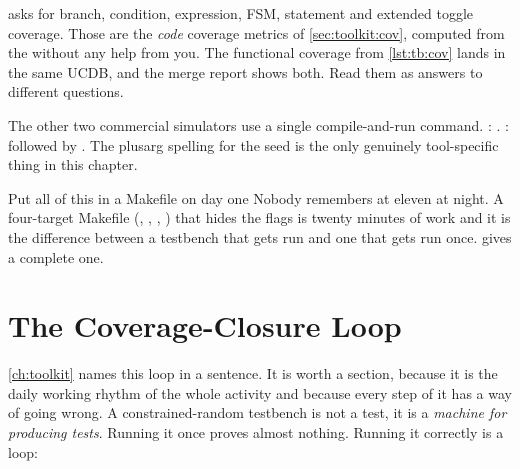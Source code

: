  asks for branch, condition, expression, FSM, statement and
extended toggle coverage. Those are the \emph{code} coverage metrics of
\cref{sec:toolkit:cov}, computed from the \RTL{} without any help from you. The
functional coverage from \cref{lst:tb:cov} lands in the same UCDB, and the
merge report shows both. Read them as answers to different questions.

The other two commercial simulators use a single compile-and-run command.
: . :  followed by . The
plusarg spelling for the seed is the only genuinely tool-specific thing in this
chapter.

\begin{tipbox}{Put all of this in a Makefile on day one}
Nobody remembers  at eleven at night. A four-target Makefile
(, , , ) that hides the flags is
twenty minutes of work and it is the difference between a testbench that gets
run and one that gets run once.  gives a complete one.
\end{tipbox}

\section{The Coverage-Closure Loop}
\label{sec:tb:closure}

\cref{ch:toolkit} names this loop in a sentence. It is
worth a section, because it is the daily working rhythm of the whole activity
and because every step of it has a way of going wrong. A constrained-random
testbench is not a test, it is a \emph{machine for producing tests}. Running it
once proves almost nothing. Running it correctly is a loop:

